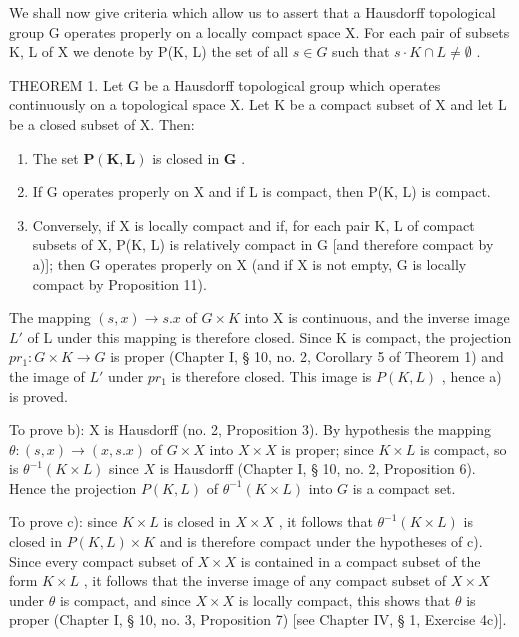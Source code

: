 We shall now give criteria which allow us to assert that a Hausdorff topological group G operates properly on a locally compact space X. For each pair of subsets K, L of X we denote by P(K, L) the set of all \(s \in G\) such that \(s \cdot K \cap L \neq \emptyset\) .

THEOREM 1. Let G be a Hausdorff topological group which operates continuously on a topological space X. Let K be a compact subset of X and let L be a closed subset of X. Then:

\begin{enumerate}
\def\labelenumi{\alph{enumi})}
\item
  The set \(\mathbf{P}(\mathbf{K},\mathbf{L})\) is closed in \(\mathbf{G}\) .
\item
  If G operates properly on X and if L is compact, then P(K, L) is compact.
\item
  Conversely, if X is locally compact and if, for each pair K, L of compact subsets of X, P(K, L) is relatively compact in G {[}and therefore compact by a){]}; then G operates properly on X (and if X is not empty, G is locally compact by Proposition 11).
\end{enumerate}

The mapping \((s, x) \to s.x\) of \(G \times K\) into X is continuous, and the inverse image \(L'\) of L under this mapping is therefore closed. Since K is compact, the projection \(pr_{1}: G \times K \to G\) is proper (Chapter I, § 10, no. 2, Corollary 5 of Theorem 1) and the image of \(L'\) under \(pr_{1}\) is therefore closed. This image is \(P(K, L)\) , hence a) is proved.

To prove b): X is Hausdorff (no. 2, Proposition 3). By hypothesis the mapping \(\theta: (s, x) \to (x, s.x)\) of \(G \times X\) into \(X \times X\) is proper; since \(K \times L\) is compact, so is \(\theta^{-1}(K \times L)\) since \(X\) is Hausdorff (Chapter I, § 10, no. 2, Proposition 6). Hence the projection \(P(K, L)\) of \(\theta^{-1}(K \times L)\) into \(G\) is a compact set.

To prove c): since \(K \times L\) is closed in \(X \times X\) , it follows that \(\theta^{-1}(K \times L)\) is closed in \(P(K, L) \times K\) and is therefore compact under the hypotheses of c). Since every compact subset of \(X \times X\) is contained in a compact subset of the form \(K \times L\) , it follows that the inverse image of any compact subset of \(X \times X\) under \(\theta\) is compact, and since \(X \times X\) is locally compact, this shows that \(\theta\) is proper (Chapter I, § 10, no. 3, Proposition 7) {[}see Chapter IV, § 1, Exercise 4c){]}.

